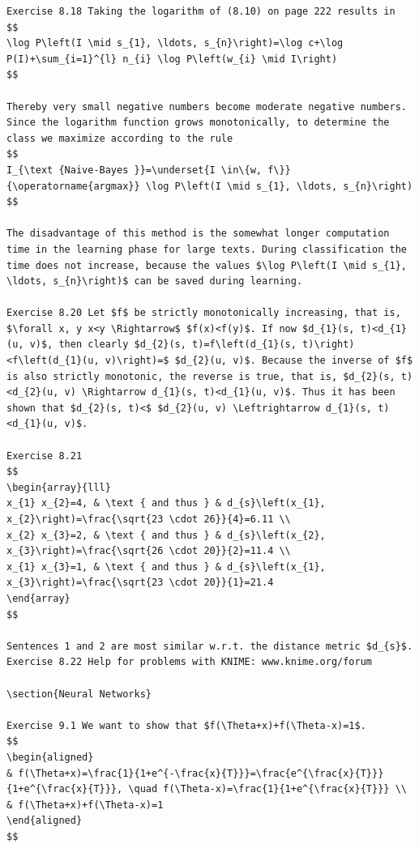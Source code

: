\documentclass[10pt]{book}
\begin{document}
\begin{verbatim}
Exercise 8.18 Taking the logarithm of (8.10) on page 222 results in
$$
\log P\left(I \mid s_{1}, \ldots, s_{n}\right)=\log c+\log P(I)+\sum_{i=1}^{l} n_{i} \log P\left(w_{i} \mid I\right)
$$

Thereby very small negative numbers become moderate negative numbers. Since the logarithm function grows monotonically, to determine the class we maximize according to the rule
$$
I_{\text {Naive-Bayes }}=\underset{I \in\{w, f\}}{\operatorname{argmax}} \log P\left(I \mid s_{1}, \ldots, s_{n}\right)
$$

The disadvantage of this method is the somewhat longer computation time in the learning phase for large texts. During classification the time does not increase, because the values $\log P\left(I \mid s_{1}, \ldots, s_{n}\right)$ can be saved during learning.

Exercise 8.20 Let $f$ be strictly monotonically increasing, that is, $\forall x, y x<y \Rightarrow$ $f(x)<f(y)$. If now $d_{1}(s, t)<d_{1}(u, v)$, then clearly $d_{2}(s, t)=f\left(d_{1}(s, t)\right)<f\left(d_{1}(u, v)\right)=$ $d_{2}(u, v)$. Because the inverse of $f$ is also strictly monotonic, the reverse is true, that is, $d_{2}(s, t)<d_{2}(u, v) \Rightarrow d_{1}(s, t)<d_{1}(u, v)$. Thus it has been shown that $d_{2}(s, t)<$ $d_{2}(u, v) \Leftrightarrow d_{1}(s, t)<d_{1}(u, v)$.

Exercise 8.21
$$
\begin{array}{lll}
x_{1} x_{2}=4, & \text { and thus } & d_{s}\left(x_{1}, x_{2}\right)=\frac{\sqrt{23 \cdot 26}}{4}=6.11 \\
x_{2} x_{3}=2, & \text { and thus } & d_{s}\left(x_{2}, x_{3}\right)=\frac{\sqrt{26 \cdot 20}}{2}=11.4 \\
x_{1} x_{3}=1, & \text { and thus } & d_{s}\left(x_{1}, x_{3}\right)=\frac{\sqrt{23 \cdot 20}}{1}=21.4
\end{array}
$$

Sentences 1 and 2 are most similar w.r.t. the distance metric $d_{s}$.
Exercise 8.22 Help for problems with KNIME: www.knime.org/forum

\section{Neural Networks}

Exercise 9.1 We want to show that $f(\Theta+x)+f(\Theta-x)=1$.
$$
\begin{aligned}
& f(\Theta+x)=\frac{1}{1+e^{-\frac{x}{T}}}=\frac{e^{\frac{x}{T}}}{1+e^{\frac{x}{T}}}, \quad f(\Theta-x)=\frac{1}{1+e^{\frac{x}{T}}} \\
& f(\Theta+x)+f(\Theta-x)=1
\end{aligned}
$$


\end{verbatim}
\end{document}
